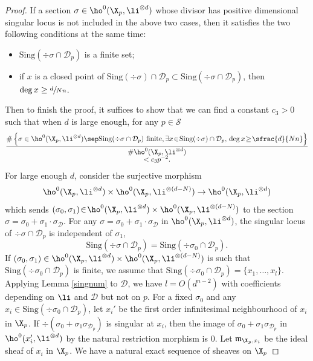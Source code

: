 \begin{proof}
If a section $ \sigma\in \ho^0(\X_p, \li^{\otimes d})$ whose divisor has positive dimensional singular locus is not included in the above two cases, then it satisfies the two following conditions at the same time:
\begin{itemize}
\item $\mathrm{Sing}(\div \sigma\cap \mathcal{D}_p)$ is a finite set;
\item if $x$ is a closed point of $\mathrm{Sing}(\div \sigma)\cap \mathcal{D}_p\subset \mathrm{Sing}(\div \sigma\cap \mathcal{D}_p)$, then $\deg x\geq \sfrac{d}{Nn} $.
\end{itemize}
Then to finish the proof, it suffices to show that we can find a constant $c_3>0$ such that when $d$ is large enough, for any $p\in \mathcal{S}$
\begin{multline*}
\frac{\#\left\{ \sigma\in \ho^0(\X_p, \li^{\otimes d})\sep \mathrm{Sing}(\div \sigma\cap \mathcal{D}_p) \text{ finite,}\, \exists x\!\in\!\mathrm{Sing}(\div \sigma)\cap \mathcal{D}_p,\, \deg x\!\geq\! \sfrac{d}{Nn} \right\}}{\#\ho^0(\X_p, \li^{\otimes d})}\\[-5pt]
< c_3p^{-2}.
\end{multline*}
For large enough $d$, consider the surjective morphism
\begin{align*}
\ho^0(\X_p, \li^{\otimes d})\times \ho^0(\X_p, \li^{\otimes (d-N)}) \to \ho^0(\X_p, \li^{\otimes d})
\end{align*}
which sends $(\sigma_0, \sigma_1)\!\in\!\ho^0(\X_p, \li^{\otimes d})\times \ho^0(\X_p, \li^{\otimes (d-N)})$ to the section \hbox{$\sigma\!=\!\sigma_0\!+\!\sigma_1{\cdot} \sigma_{\mathcal{D}}$}. For any $\sigma=\sigma_0+\sigma_1\cdot \sigma_{\mathcal{D}}$ in $\ho^0(\X_p, \li^{\otimes d})$, the singular locus of $\div \sigma\cap \mathcal{D}_p$ is independent of $\sigma_1$, \ie
\[
\mathrm{Sing}(\div \sigma\cap \mathcal{D}_p)=\mathrm{Sing}(\div \sigma_0\cap \mathcal{D}_p).
\]
\Changel%
If $(\sigma_0, \sigma_1)\in \ho^0(\X_p, \li^{\otimes d})\times \ho^0(\X_p, \li^{\otimes (d-N)})$ is such that $\mathrm{Sing}(\div \sigma_0\cap \mathcal{D}_p)$ is finite, we assume that $\mathrm{Sing}(\div \sigma_0\cap \mathcal{D}_p)=\{ x_1,\dots ,x_l \}$. Applying Lemma \ref{singnum} to $\mathcal{D}$, we have $l=O(d^{n-2})$ with coefficients depending on $\li$ and $\mathcal{D}$ but not on $p$. For a fixed $\sigma_0$ and any $x_i\in \mathrm{Sing}(\div \sigma_0\cap \mathcal{D}_p)$, let $x_i'$ be the first order infinitesimal neighbourhood of $x_i$ in $\X_p$. If $\div \left(\sigma_0+\sigma_1\sigma_{\mathcal{D}_p}\right)$ is singular at $x_i$, then the image of $\sigma_0+\sigma_1\sigma_{\mathcal{D}_p}$ in $\ho^0(x_i', \li^{\otimes d})$ by the natural restriction morphism is $0$. Let $\mathfrak{m}_{\X_p, x_i}$ be the ideal sheaf of $x_i$ in $\X_p$. We have a natural exact sequence of sheaves on $\X_p$\Changelback%

\end{proof}
